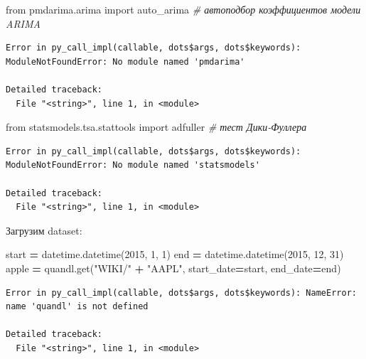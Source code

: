 \documentclass[]{book}
\newenvironment{Shaded}{\begin{snugshade}}{\end{snugshade}}
\newcommand{\CommentTok}[1]{\textcolor[rgb]{0.56,0.35,0.01}{\textit{#1}}}
\newcommand{\DecValTok}[1]{\textcolor[rgb]{0.00,0.00,0.81}{#1}}
\newcommand{\ImportTok}[1]{#1}
\newcommand{\NormalTok}[1]{#1}
\newcommand{\OperatorTok}[1]{\textcolor[rgb]{0.81,0.36,0.00}{\textbf{#1}}}
\newcommand{\StringTok}[1]{\textcolor[rgb]{0.31,0.60,0.02}{#1}}
\begin{document}
\begin{Shaded}
\begin{Highlighting}[]
\ImportTok{from}\NormalTok{ pmdarima.arima }\ImportTok{import}\NormalTok{ auto_arima }\CommentTok{# автоподбор коэффициентов модели ARIMA}
\end{Highlighting}
\end{Shaded}

\begin{verbatim}
Error in py_call_impl(callable, dots$args, dots$keywords): ModuleNotFoundError: No module named 'pmdarima'

Detailed traceback: 
  File "<string>", line 1, in <module>
\end{verbatim}

\begin{Shaded}
\begin{Highlighting}[]
\ImportTok{from}\NormalTok{ statsmodels.tsa.stattools }\ImportTok{import}\NormalTok{ adfuller }\CommentTok{# тест Дики-Фуллера}
\end{Highlighting}
\end{Shaded}

\begin{verbatim}
Error in py_call_impl(callable, dots$args, dots$keywords): ModuleNotFoundError: No module named 'statsmodels'

Detailed traceback: 
  File "<string>", line 1, in <module>
\end{verbatim}

Загрузим dataset:

\begin{Shaded}
\begin{Highlighting}[]
\NormalTok{start }\OperatorTok{=}\NormalTok{ datetime.datetime(}\DecValTok{2015}\NormalTok{, }\DecValTok{1}\NormalTok{, }\DecValTok{1}\NormalTok{)}
\NormalTok{end }\OperatorTok{=}\NormalTok{ datetime.datetime(}\DecValTok{2015}\NormalTok{, }\DecValTok{12}\NormalTok{, }\DecValTok{31}\NormalTok{)}
\NormalTok{apple }\OperatorTok{=}\NormalTok{ quandl.get(}\StringTok{"WIKI/"} \OperatorTok{+} \StringTok{"AAPL"}\NormalTok{, start_date}\OperatorTok{=}\NormalTok{start, end_date}\OperatorTok{=}\NormalTok{end)}
\end{Highlighting}
\end{Shaded}

\begin{verbatim}
Error in py_call_impl(callable, dots$args, dots$keywords): NameError: name 'quandl' is not defined

Detailed traceback: 
  File "<string>", line 1, in <module>
\end{verbatim}
\end{document}
